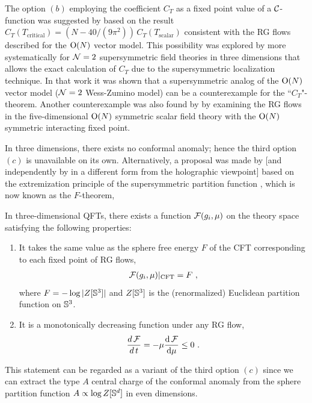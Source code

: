 The option $(b)$ employing the coefficient $C_T$ as a fixed point value of a ${\cal C}$-function was suggested by \textcite{Petkou:1995vu} based on the result $C_T (T_\text{critical}) = \left( N - 40/(9\pi^2) \right)\, C_T (T_\text{scalar})$ consistent with the RG flows described for the $\mathrm{O}(N)$ vector model.
This possibility was explored by \textcite{Nishioka:2013gza} more systematically for ${\cal N} =2$ supersymmetric field theories in three dimensions that allows the exact calculation of $C_T$ due to the supersymmetric localization technique.
In that work it was shown that a supersymmetric analog of the $\mathrm{O}(N)$ vector model (${\cal N}=2$ Wess-Zumino model) can be a counterexample for the ``$C_T$"-theorem.
Another counterexample was also found by \textcite{Fei:2014yja} by examining the RG flows in the five-dimensional $\mathrm{O}(N)$ symmetric scalar field theory with the $\mathrm{O}(N)$ symmetric interacting fixed point.


In three dimensions, there exists no conformal anomaly; hence the third option $(c)$ is unavailable on its own.
Alternatively, a proposal was made by \textcite{Jafferis:2011zi} [and independently by \textcite{Myers:2010xs,Myers:2010tj} in a different form from the holographic viewpoint] based on the extremization principle of the supersymmetric partition function \cite{Jafferis:2010un}, which is now known as the $F$-theorem,
\begin{theorem*}[$F$-theorem]
In three-dimensional QFTs, there exists a function ${\cal F}(g_i, \mu)$ on the theory space satisfying the following properties:
\begin{enumerate}
\item It takes the same value as the sphere free energy $F$ of the CFT corresponding to each fixed point of RG flows,
	\begin{align}\label{REE_F}
		{\cal F}(g_i, \mu) |_\mathrm{CFT} = F \ ,
	\end{align}
	where $F=-\log |Z[\mathbb{S}^3]|$ and $Z[\mathbb{S}^3]$ is the (renormalized) Euclidean partition function on $\mathbb{S}^3$.
\item It is a monotonically decreasing function under any RG flow,
	\begin{align}\label{REEMonotonicity}
		\frac{d\,{\cal F}}{d\,t}  = - \mu \frac{\mathrm{d}\,{\cal F}}{\mathrm{d}\mu} \le 0 \ .
	\end{align}
\end{enumerate}
\end{theorem*}
This statement can be regarded as a variant of the third option $(c)$ since we can extract the type $A$ central charge of the conformal anomaly from the sphere partition function $A \propto \log Z[\mathbb{S}^d]$ in even dimensions.


